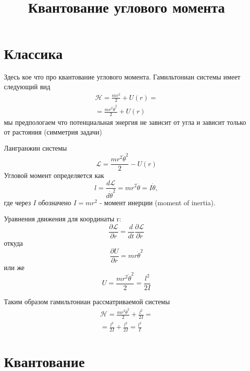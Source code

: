 

\title{Квантование углового момента}


\Russian
\maketitle

\section{Классика}
Здесь кое что про квантование углового момента. Гамильтониан системы
имеет следующий вид 
\begin{eqnarray}
\mathcal{H} = \frac{m v^2}{2} + U\left( r \right) = 
\nonumber \\
= \frac{m r^2 \dot{\theta}^2 }{2} + U\left( r \right)
\nonumber
\end{eqnarray}
мы предпологаем что потенциальная энергия не зависит от угла и зависит
только от растояния (симметрия задачи)

Лангранжин системы
\[
\mathcal{L} = \frac{m r^2 \dot{\theta}^2 }{2} - U\left( r \right)
\]
Угловой момент определяется как 
\begin{equation}
l = \frac{d \mathcal{L}}{d \dot{\theta}^2} = 
m r^2 \dot{\theta} = I \dot{\theta},
\label{eqAngualrMomentumClass}
\end{equation}
где через $I$ обозначено $I = m r^2$ - момент инерции (moment of
inertia).

Уравнения движения для координаты r:
\[
\frac{ \partial \mathcal{L} }{\partial r} = 
\frac{d}{d t} \frac{\partial \mathcal{L}}{\partial \dot{r}}
\]
 откуда
\[
\frac{\partial U}{\partial r} = m r \dot{\theta}^2
\]
 или же
\[
 U = \frac{m r^2 \dot{\theta}^2}{2} = \frac{l^2}{2 I}
\]
 
Таким образом гамильтониан рассматриваемой системы
\begin{eqnarray}
\mathcal{H} = \frac{m r^2 \dot{\theta}^2 }{2} + \frac{l^2}{2 I} = 
\nonumber \\
= \frac{l^2}{2 I} + \frac{l^2}{2 I} = \frac{l^2}{I}
\label{eqHClassical}
\end{eqnarray}

\section{Квантование}

